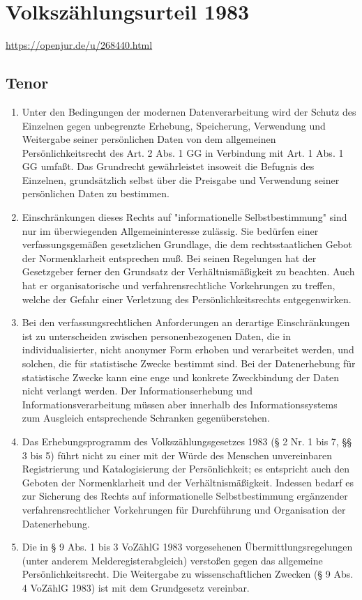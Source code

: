 \chapter{Volkszählungsurteil 1983}
\newline
\url{https://openjur.de/u/268440.html}

    \section{Tenor}
        \begin{enumerate}
            \item Unter den Bedingungen der modernen Datenverarbeitung wird der Schutz des Einzelnen gegen unbegrenzte Erhebung, Speicherung, Verwendung und Weitergabe seiner persönlichen Daten von dem allgemeinen Persönlichkeitsrecht des Art. 2 Abs. 1 GG in Verbindung mit Art. 1 Abs. 1 GG umfaßt. Das Grundrecht gewährleistet insoweit die Befugnis des Einzelnen, grundsätzlich selbst über die Preisgabe und Verwendung seiner persönlichen Daten zu bestimmen.
            \item Einschränkungen dieses Rechts auf "informationelle Selbstbestimmung" sind nur im überwiegenden Allgemeininteresse zulässig. Sie bedürfen einer verfassungsgemäßen gesetzlichen Grundlage, die dem rechtsstaatlichen Gebot der Normenklarheit entsprechen muß. Bei seinen Regelungen hat der Gesetzgeber ferner den Grundsatz der Verhältnismäßigkeit zu beachten. Auch hat er organisatorische und verfahrensrechtliche Vorkehrungen zu treffen, welche der Gefahr einer Verletzung des Persönlichkeitsrechts entgegenwirken.     \item Bei den verfassungsrechtlichen Anforderungen an derartige Einschränkungen ist zu unterscheiden zwischen personenbezogenen Daten, die in individualisierter, nicht anonymer Form erhoben und verarbeitet werden, und solchen, die für statistische Zwecke bestimmt sind. Bei der Datenerhebung für statistische Zwecke kann eine enge und konkrete Zweckbindung der Daten nicht verlangt werden. Der Informationserhebung und Informationsverarbeitung müssen aber innerhalb des Informationssystems zum Ausgleich entsprechende Schranken gegenüberstehen.
            \item Das Erhebungsprogramm des Volkszählungsgesetzes 1983 (§ 2 Nr. 1 bis 7, §§ 3 bis 5) führt nicht zu einer mit der Würde des Menschen unvereinbaren Registrierung und Katalogisierung der Persönlichkeit; es entspricht auch den Geboten der Normenklarheit und der Verhältnismäßigkeit. Indessen bedarf es zur Sicherung des Rechts auf informationelle Selbstbestimmung ergänzender verfahrensrechtlicher Vorkehrungen für Durchführung und Organisation der Datenerhebung. 
            \item Die in § 9 Abs. 1 bis 3 VoZählG 1983 vorgesehenen Übermittlungsregelungen (unter anderem Melderegisterabgleich) verstoßen gegen das allgemeine Persönlichkeits\-recht. Die Weitergabe zu wissenschaftlichen Zwecken (§ 9 Abs. 4 VoZählG 1983) ist mit dem Grundgesetz vereinbar. 
        \end{enumerate}
